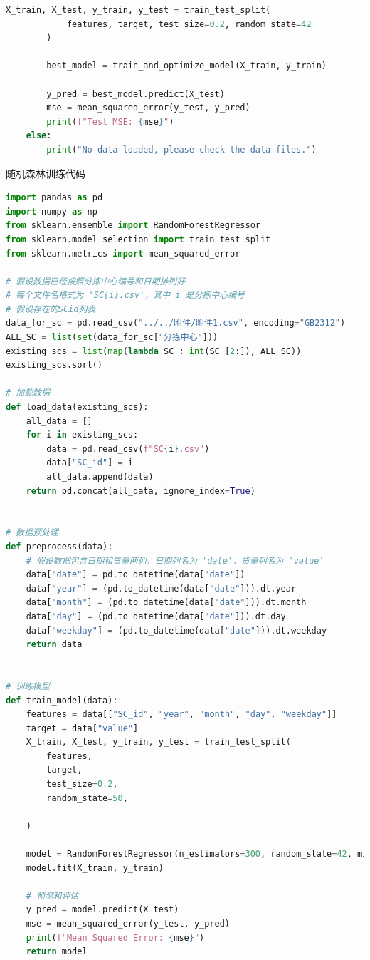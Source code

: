 \documentclass[UTF8]{article}%
\begin{document}
\begin{lstlisting}[language=python]
        X_train, X_test, y_train, y_test = train_test_split(
            features, target, test_size=0.2, random_state=42
        )

        best_model = train_and_optimize_model(X_train, y_train)

        y_pred = best_model.predict(X_test)
        mse = mean_squared_error(y_test, y_pred)
        print(f"Test MSE: {mse}")
    else:
        print("No data loaded, please check the data files.")
\end{lstlisting}

\noindent 随机森林训练代码
\begin{lstlisting}[language=python]
import pandas as pd
import numpy as np
from sklearn.ensemble import RandomForestRegressor
from sklearn.model_selection import train_test_split
from sklearn.metrics import mean_squared_error

# 假设数据已经按照分拣中心编号和日期排列好
# 每个文件名格式为 'SC{i}.csv'，其中 i 是分拣中心编号
# 假设存在的SCid列表
data_for_sc = pd.read_csv("../../附件/附件1.csv", encoding="GB2312")
ALL_SC = list(set(data_for_sc["分拣中心"]))
existing_scs = list(map(lambda SC_: int(SC_[2:]), ALL_SC))
existing_scs.sort()

# 加载数据
def load_data(existing_scs):
    all_data = []
    for i in existing_scs:
        data = pd.read_csv(f"SC{i}.csv")
        data["SC_id"] = i
        all_data.append(data)
    return pd.concat(all_data, ignore_index=True)


# 数据预处理
def preprocess(data):
    # 假设数据包含日期和货量两列，日期列名为 'date'，货量列名为 'value'
    data["date"] = pd.to_datetime(data["date"])
    data["year"] = (pd.to_datetime(data["date"])).dt.year
    data["month"] = (pd.to_datetime(data["date"])).dt.month
    data["day"] = (pd.to_datetime(data["date"])).dt.day
    data["weekday"] = (pd.to_datetime(data["date"])).dt.weekday
    return data


# 训练模型
def train_model(data):
    features = data[["SC_id", "year", "month", "day", "weekday"]]
    target = data["value"]
    X_train, X_test, y_train, y_test = train_test_split(
        features,
        target,
        test_size=0.2,
        random_state=50,

    )

    model = RandomForestRegressor(n_estimators=300, random_state=42, min_samples_split=20)
    model.fit(X_train, y_train)

    # 预测和评估
    y_pred = model.predict(X_test)
    mse = mean_squared_error(y_test, y_pred)
    print(f"Mean Squared Error: {mse}")
    return model



\end{lstlisting}
\end{document}
